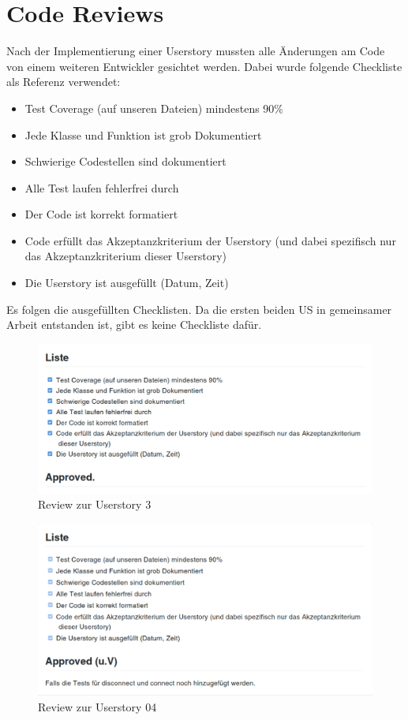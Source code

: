 \documentclass[accentcolor=tud9c,12pt,paper=a4]{tudreport}
\begin{document}
	\newpage
	\section{Code Reviews}
	Nach der Implementierung einer Userstory mussten alle Änderungen am Code von einem weiteren Entwickler
	gesichtet werden. Dabei wurde folgende Checkliste als Referenz verwendet:
	\begin{itemize}
		\item Test Coverage (auf unseren Dateien) mindestens 90\%
		\item Jede Klasse und Funktion ist grob Dokumentiert
		\item Schwierige Codestellen sind dokumentiert
		\item Alle Test laufen fehlerfrei durch
		\item Der Code ist korrekt formatiert
		\item Code erfüllt das Akzeptanzkriterium der Userstory (und dabei spezifisch nur das Akzeptanzkriterium dieser Userstory)
		\item Die Userstory ist ausgefüllt (Datum, Zeit)
	\end{itemize}
	Es folgen die ausgefüllten Checklisten. Da die ersten beiden US in gemeinsamer Arbeit entstanden ist, gibt es keine Checkliste dafür.
	\begin{figure}[H]
	\centering
	\includegraphics[width=.8\textwidth]{code_review/us03}
		\caption{Review zur Userstory 3}
	\end{figure}

\begin{figure}[H]
\centering
\includegraphics[width=.8\textwidth]{code_review/us04}
\caption{Review zur Userstory 04}
\end{figure}
\end{document}
